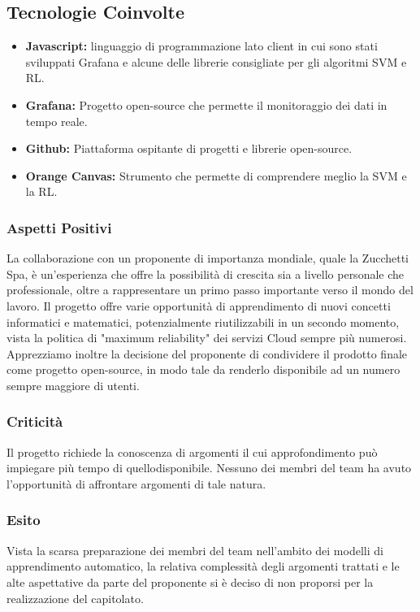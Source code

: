 	\subsection{Tecnologie Coinvolte}
	\begin{itemize}
		\item \textbf{Javascript:} linguaggio di programmazione lato client in cui sono stati sviluppati Grafana e alcune delle librerie consigliate per gli algoritmi SVM e RL.
		\item \textbf{Grafana:} Progetto open-source che permette il monitoraggio dei dati in tempo reale.
		\item \textbf{Github:} Piattaforma ospitante di progetti e librerie open-source.
		\item \textbf{Orange Canvas:} Strumento che permette di comprendere meglio la SVM e la RL.
	\end{itemize}
	
	\subsubsection{Aspetti Positivi}
		La collaborazione con un proponente di importanza mondiale, quale la Zucchetti Spa, è un'esperienza che offre la possibilità di crescita sia a livello personale che professionale, oltre a rappresentare un primo passo importante verso il mondo del lavoro. Il progetto offre varie opportunità di apprendimento di nuovi concetti 	informatici e matematici, potenzialmente riutilizzabili in un secondo momento, vista 	la politica di "maximum reliability" dei servizi Cloud sempre più numerosi. Apprezziamo inoltre la decisione del proponente di condividere il prodotto finale come progetto open-source, in modo tale da renderlo disponibile ad un numero 	sempre maggiore di utenti.
	
	\subsubsection{Criticità}
		Il progetto richiede la conoscenza di argomenti il cui approfondimento può impiegare più tempo di quellodisponibile. Nessuno dei membri del team ha avuto l'opportunità di affrontare argomenti di tale natura.
	
	\subsubsection{Esito}
		Vista la scarsa preparazione dei membri del team nell'ambito dei modelli di apprendimento automatico, la relativa complessità degli argomenti trattati e le alte aspettative da parte del proponente si è deciso di non proporsi per la realizzazione del capitolato.